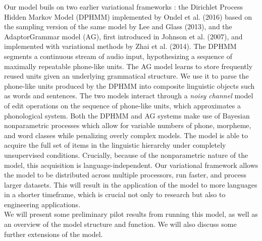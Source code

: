 \documentclass[12pt,letterpaper]{article}
\newif\ifcomments
\newcommand{\cm}[1]{\textcolor{purple}{\ifcomments[COMMENT: #1]\else\fi}}
\begin{document}
Our model buils on two earlier variational frameworks
: the Dirichlet Process Hidden Markov Model (DPHMM) implemented by Ondel et al. (2016) based on the sampling version of the same model by Lee and Glass (2013), and the AdaptorGrammar model (AG), first introduced in Johnson et al. (2007), and implemented with variational methods by Zhai et al. (2014). The DPHMM segments a continuous stream of audio input, hypothesizing a sequence of maximally repeatable phone-like units.
The AG model learns to store frequently reused units given an underlying grammatical structure. We use it to parse the phone-like units produced by the DPHMM into composite linguistic objects such as words and sentences. 
The two models interact through a \textit{noisy channel}
 model of edit operations on the sequence of phone-like units, which approximates a phonological system. Both the DPHMM and AG systems make use of Bayesian nonparametric processes which allow for variable numbers of phone, morpheme, and word classes while penalizing overly complex models.
The model is able to acquire the full set of items in the linguistic hierarchy under completely unsupervised conditions. Crucially, because of the nonparametric nature of the model, this acquisition is language-independent. Our variational framework allows the model to be distributed across multiple processors, run faster, and process larger datasets. This will result in the application of the model to more languages in a shorter timeframe, which is crucial not only to research but also to engineering applications.  \\
We will present some preliminary pilot results from running this model, as well as an overview of the model structure and function. We will also discuss some further extensions of the model.\cm{I need to think a little about what to say now about results....}
\end{document}
